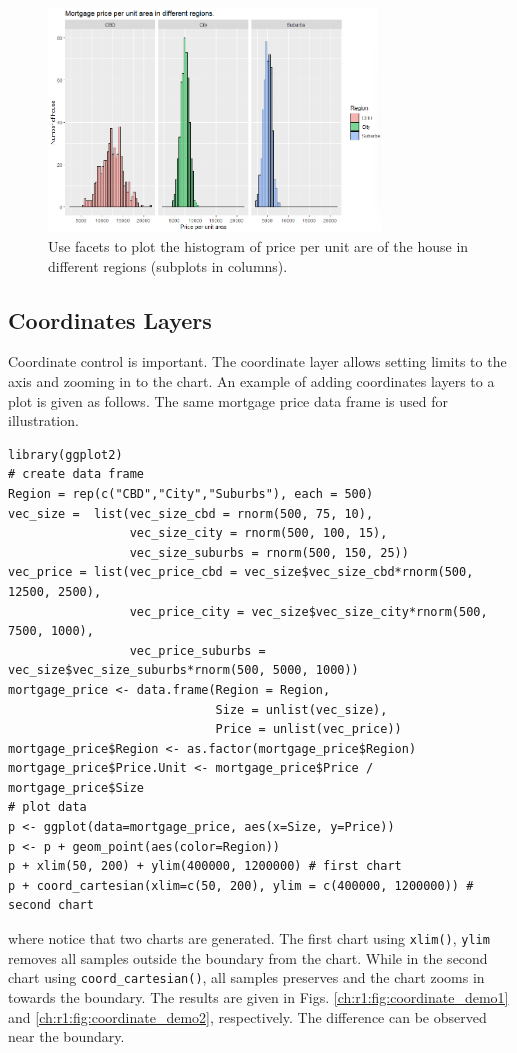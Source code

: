\begin{figure}
	\centering
	\includegraphics[width=250pt]{chapters/ch-r/figures/mortgage_histogram_demo_f2.png}
	\caption{Use facets to plot the histogram of price per unit are of the house in different regions (subplots in columns).} \label{ch:r1:fig:mortgage_histogram_demo_f2}
\end{figure}

\subsection{Coordinates Layers}

Coordinate control is important. The coordinate layer allows setting limits to the axis and zooming in to the chart. An example of adding coordinates layers to a plot is given as follows. The same mortgage price data frame is used for illustration.
\begin{lstlisting}
library(ggplot2)
# create data frame
Region = rep(c("CBD","City","Suburbs"), each = 500)
vec_size =  list(vec_size_cbd = rnorm(500, 75, 10),
                 vec_size_city = rnorm(500, 100, 15),
                 vec_size_suburbs = rnorm(500, 150, 25))
vec_price = list(vec_price_cbd = vec_size$vec_size_cbd*rnorm(500, 12500, 2500),
                 vec_price_city = vec_size$vec_size_city*rnorm(500, 7500, 1000),
                 vec_price_suburbs = vec_size$vec_size_suburbs*rnorm(500, 5000, 1000))
mortgage_price <- data.frame(Region = Region,
                             Size = unlist(vec_size),
                             Price = unlist(vec_price))
mortgage_price$Region <- as.factor(mortgage_price$Region)
mortgage_price$Price.Unit <- mortgage_price$Price / mortgage_price$Size
# plot data
p <- ggplot(data=mortgage_price, aes(x=Size, y=Price))
p <- p + geom_point(aes(color=Region))
p + xlim(50, 200) + ylim(400000, 1200000) # first chart
p + coord_cartesian(xlim=c(50, 200), ylim = c(400000, 1200000)) # second chart
\end{lstlisting}
where notice that two charts are generated. The first chart using \verb|xlim()|, \verb|ylim| removes all samples outside the boundary from the chart. While in the second chart using \verb|coord_cartesian()|, all samples preserves and the chart zooms in towards the boundary. The results are given in Figs. \ref{ch:r1:fig:coordinate_demo1} and \ref{ch:r1:fig:coordinate_demo2}, respectively. The difference can be observed near the boundary.

